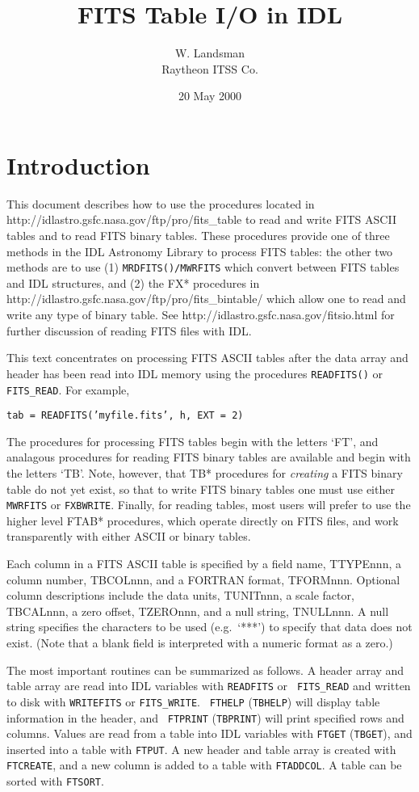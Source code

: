 \documentclass[twoside,12pt]{article}
\title{FITS Table I/O in IDL}
\author{W. Landsman \\ Raytheon ITSS Co.}
\date{20 May 2000}
\newcommand{\exone}[1]{\begin{center}\tt #1 \end{center}}
\begin{document}
\maketitle
\section{Introduction} 

This document describes how to use the procedures located in \\
http://idlastro.gsfc.nasa.gov/ftp/pro/fits\_table to read and write FITS ASCII
tables  and to read FITS 
binary tables.    These procedures provide one of three methods in the IDL
Astronomy Library to process FITS tables: the other two methods are to use (1)
{\tt MRDFITS()/MWRFITS} which convert between FITS tables and IDL structures, and (2)
the FX* procedures in \\
http://idlastro.gsfc.nasa.gov/ftp/pro/fits\_bintable/ which allow one to read
and write any type of binary table.  See
http://idlastro.gsfc.nasa.gov/fitsio.html for further discussion of reading
FITS files with IDL.

This text concentrates on processing FITS ASCII tables after the data array and
header  has been read into IDL memory using the procedures {\tt READFITS()} or
{\tt FITS\_READ}.   For example,

\exone{tab = READFITS('myfile.fits', h, EXT = 2) }

The procedures for processing FITS tables begin with the letters `FT', and 
analagous procedures for reading FITS binary tables are available and begin
with the letters `TB'.   Note, however, that TB* procedures for {\em creating}
a FITS binary table do not yet exist, so that to write FITS binary tables one
must use either {\tt MWRFITS} or {\tt FXBWRITE}.     Finally, for reading
tables, most users will
prefer to use the higher level FTAB* procedures, which operate directly on FITS
files, and work transparently with either ASCII or binary tables.

Each column in a FITS ASCII table 
is specified by a field name, TTYPEnnn, a column number, TBCOLnnn,
and a FORTRAN format, TFORMnnn.  Optional column descriptions include
the data units, TUNITnnn, a scale factor, TBCALnnn, a zero offset,
TZEROnnn, and a null string, TNULLnnn.  A null string specifies the 
characters to be used (e.g.\  `***') to specify that data does not exist.
(Note that a blank field is interpreted with a numeric format as a zero.) 

The most important routines can be summarized as follows. A header array and
table array are read into IDL variables with {\tt READFITS} or {\tt
FITS\_READ}  and written to disk with {\tt WRITEFITS} or {\tt FITS\_WRITE}.  {\tt
FTHELP} ({\tt TBHELP}) will display table information in the header, and {\tt
FTPRINT} ({\tt TBPRINT}) will print specified rows and columns.  Values are read from a table
into IDL variables with {\tt FTGET} ({\tt TBGET}), and inserted into a table with
{\tt FTPUT}.  A new header and table array is created with {\tt FTCREATE}, and
a new column is added to a table with {\tt FTADDCOL}.  A table can be sorted
with {\tt FTSORT}.
\end{document}
